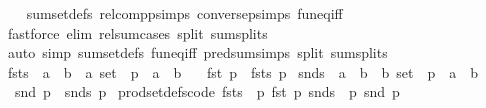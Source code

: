 \begin{isabellebody}
\ \ \isamarkupfalse%
\ sum{\isacharunderscore}{\kern0pt}set{\isacharunderscore}{\kern0pt}defs\ relcompp{\isachardot}{\kern0pt}simps\ conversep{\isachardot}{\kern0pt}simps\ fun{\isacharunderscore}{\kern0pt}eq{\isacharunderscore}{\kern0pt}iff\isanewline
\ \ \isamarkupfalse%
\ {\isacharparenleft}{\kern0pt}fastforce\ elim{\isacharcolon}{\kern0pt}\ rel{\isacharunderscore}{\kern0pt}sum{\isachardot}{\kern0pt}cases\ split{\isacharcolon}{\kern0pt}\ sum{\isachardot}{\kern0pt}splits{\isacharparenright}{\kern0pt}\isanewline
{}\isamarkupfalse%
\ {\isacharparenleft}{\kern0pt}auto\ simp{\isacharcolon}{\kern0pt}\ sum{\isacharunderscore}{\kern0pt}set{\isacharunderscore}{\kern0pt}defs\ fun{\isacharunderscore}{\kern0pt}eq{\isacharunderscore}{\kern0pt}iff\ pred{\isacharunderscore}{\kern0pt}sum{\isachardot}{\kern0pt}simps\ split{\isacharcolon}{\kern0pt}\ sum{\isachardot}{\kern0pt}splits{\isacharparenright}{\kern0pt}%
\endisatagproof
{\isafoldproof}%
%
\isadelimproof
\isanewline
%
\endisadelimproof
\isanewline
{}\isamarkupfalse%
\ fsts\ {\isacharcolon}{\kern0pt}{\isacharcolon}{\kern0pt}\ {\isachardoublequoteopen}{\isacharprime}{\kern0pt}a\ {\isasymtimes}\ {\isacharprime}{\kern0pt}b\ {\isasymRightarrow}\ {\isacharprime}{\kern0pt}a\ set{\isachardoublequoteclose}\ \ p\ {\isacharcolon}{\kern0pt}{\isacharcolon}{\kern0pt}\ {\isachardoublequoteopen}{\isacharprime}{\kern0pt}a\ {\isasymtimes}\ {\isacharprime}{\kern0pt}b{\isachardoublequoteclose}\ \isanewline
\ \ {\isachardoublequoteopen}fst\ p\ {\isasymin}\ fsts\ p{\isachardoublequoteclose}\isanewline
{}\isamarkupfalse%
\ snds\ {\isacharcolon}{\kern0pt}{\isacharcolon}{\kern0pt}\ {\isachardoublequoteopen}{\isacharprime}{\kern0pt}a\ {\isasymtimes}\ {\isacharprime}{\kern0pt}b\ {\isasymRightarrow}\ {\isacharprime}{\kern0pt}b\ set{\isachardoublequoteclose}\ \ p\ {\isacharcolon}{\kern0pt}{\isacharcolon}{\kern0pt}\ {\isachardoublequoteopen}{\isacharprime}{\kern0pt}a\ {\isasymtimes}\ {\isacharprime}{\kern0pt}b{\isachardoublequoteclose}\ \isanewline
\ \ {\isachardoublequoteopen}snd\ p\ {\isasymin}\ snds\ p{\isachardoublequoteclose}\isanewline
\isanewline
{}\isamarkupfalse%
\ prod{\isacharunderscore}{\kern0pt}set{\isacharunderscore}{\kern0pt}defs{\isacharbrackleft}{\kern0pt}code{\isacharbrackright}{\kern0pt}{\isacharcolon}{\kern0pt}\ {\isachardoublequoteopen}fsts\ {\isacharequal}{\kern0pt}\ {\isacharparenleft}{\kern0pt}{\isasymlambda}p{\isachardot}{\kern0pt}\ {\isacharbraceleft}{\kern0pt}fst\ p{\isacharbraceright}{\kern0pt}{\isacharparenright}{\kern0pt}{\isachardoublequoteclose}\ {\isachardoublequoteopen}snds\ {\isacharequal}{\kern0pt}\ {\isacharparenleft}{\kern0pt}{\isasymlambda}p{\isachardot}{\kern0pt}\ {\isacharbraceleft}{\kern0pt}snd\ p{\isacharbraceright}{\kern0pt}{\isacharparenright}{\kern0pt}{\isachardoublequoteclose}\isanewline

\end{isabellebody}
